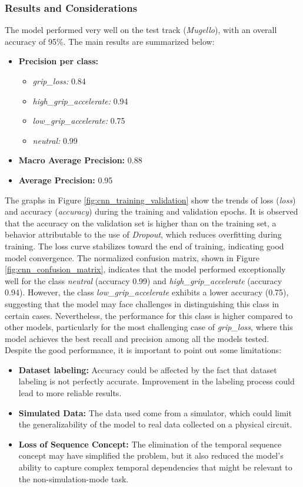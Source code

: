 \documentclass[a4paper,final,12pt]{report}
\begin{document}
\subsubsection{Results and Considerations}
The model performed very well on the test track (\textit{Mugello}), with an overall accuracy of 95\%. The main results are summarized below:
\begin{itemize}
    \item \textbf{Precision per class:}
    \begin{itemize}
        \item \textit{grip\_loss:} 0.84
        \item \textit{high\_grip\_accelerate:} 0.94
        \item \textit{low\_grip\_accelerate:} 0.75
        \item \textit{neutral:} 0.99
    \end{itemize}
    \item \textbf{Macro Average Precision:} 0.88
    \item \textbf{Average Precision:} 0.95
\end{itemize}

The graphs in Figure \ref{fig:cnn_training_validation} show the trends of loss (\textit{loss}) and accuracy (\textit{accuracy}) during the training and validation epochs. It is observed that the accuracy on the validation set is higher than on the training set, a behavior attributable to the use of \textit{Dropout}, which reduces overfitting during training. The loss curve stabilizes toward the end of training, indicating good model convergence.
The normalized confusion matrix, shown in Figure \ref{fig:cnn_confusion_matrix}, indicates that the model performed exceptionally well for the class \textit{neutral} (accuracy 0.99) and \textit{high\_grip\_accelerate} (accuracy 0.94). However, the class \textit{low\_grip\_accelerate} exhibits a lower accuracy (0.75), suggesting that the model may face challenges in distinguishing this class in certain cases. Nevertheless, the performance for this class is higher compared to other models, particularly for the most challenging case of \textit{grip\_loss}, where this model achieves the best recall and precision among all the models tested.\\

Despite the good performance, it is important to point out some limitations:
\begin{itemize}
    \item \textbf{Dataset labeling:} Accuracy could be affected by the fact that dataset labeling is not perfectly accurate. Improvement in the labeling process could lead to more reliable results.
    \item \textbf{Simulated Data:} The data used come from a simulator, which could limit the generalizability of the model to real data collected on a physical circuit.
    \item \textbf{Loss of Sequence Concept:} The elimination of the temporal sequence concept may have simplified the problem, but it also reduced the model's ability to capture complex temporal dependencies that might be relevant to the non-simulation-mode task.
\end{itemize}
\end{document}
